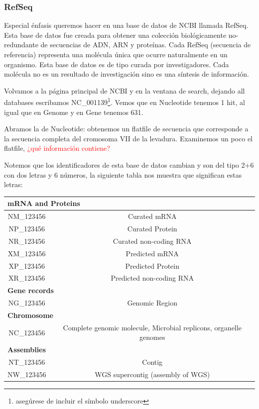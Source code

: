 \documentclass[letter,11pt]{book}
\begin{document}
\subsubsection{RefSeq}

Especial énfasis queremos hacer en una base de datos de NCBI llamada RefSeq. Esta base de datos fue creada para obtener una colección biológicamente no-redundante de secuencias de ADN, ARN y proteínas. Cada RefSeq (secuencia de referencia) representa una molécula única que ocurre naturalmente en un organismo. Esta base de datos es de tipo curada por investigadores. Cada molécula no es un resultado de investigación sino es una síntesis de información. 

Volvamos a la página principal de NCBI y en la ventana de search, dejando all databases escribamos NC\_001139\footnote{asegúrese de incluir el símbolo underscore}. Vemos que en Nucleotide tenemos 1 hit, al igual que en Genome y en Gene tenemos 631.

Abramos la de Nucleotide: obtenemos un flatfile de secuencia que corresponde a la secuencia completa del cromosoma VII de la levadura. Examinemos un poco el flatfile, \textcolor{red}{¿qué información contiene?}

Notemos que los identificadores de esta base de datos cambian y son del tipo 2+6 con dos letras y 6 números, la siguiente tabla nos muestra que significan estas letras:

\begin{tabular}{|c|c|}
\hline  \multicolumn{2}{|l|}{\textbf{mRNA and Proteins}} \\
\hline  NM\_123456 & Curated mRNA  \\ 
\hline  NP\_123456 &  Curated Protein\\ 
\hline  NR\_123456 &  Curated non-coding RNA\\ 
\hline  XM\_123456 &  Predicted mRNA\\ 
\hline  XP\_123456 &  Predicted Protein\\ 
\hline  XR\_123456 &  Predicted non-coding RNA\\ 
\hline   \multicolumn{2}{|l|}{\textbf{Gene records}} \\
\hline  NG\_123456 & Genomic Region \\ 
\hline  \multicolumn{2}{|l|}{\textbf{Chromosome}} \\ 
\hline  NC\_123456 & Complete genomic molecule, Microbial replicons, organelle genomes  \\ 
\hline  \multicolumn{2}{|l|}{\textbf{Assemblies}} \\ 
\hline  NT\_123456 & Contig \\ 
\hline  NW\_123456 & WGS supercontig (assembly of WGS) \\ 
\hline 
\end{tabular} 
\end{document}

